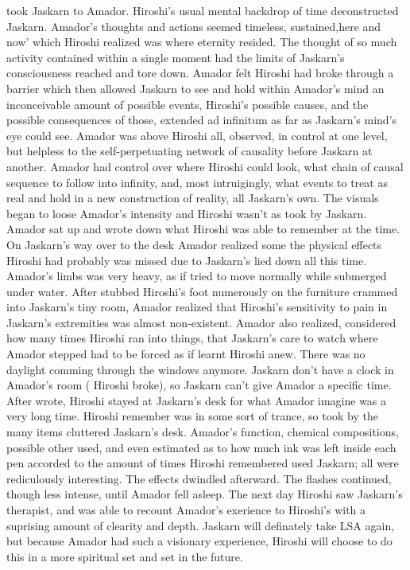 \documentclass[12pt]{book}
\begin{document}
took Jaskarn to Amador. Hiroshi's usual mental backdrop of time deconstructed Jaskarn. Amador's thoughts and actions seemed timeless, sustained,here and now' which Hiroshi realized was where eternity resided. The thought of so much activity contained within a single moment had the limits of Jaskarn's consciousness reached and tore down. Amador felt Hiroshi had broke through a barrier which then allowed Jaskarn to see and hold within Amador's mind an inconceivable amount of possible events, Hiroshi's possible causes, and the possible consequences of those, extended ad infinitum as far as Jaskarn's mind's eye could see. Amador was above Hiroshi all, observed, in control at one level, but helpless to the self-perpetuating network of causality before Jaskarn at another. Amador had control over where Hiroshi could look, what chain of causal sequence to follow into infinity, and, most intruigingly, what events to treat as real and hold in a new construction of reality, all Jaskarn's own. The visuals began to loose Amador's intensity and Hiroshi wasn't as took by Jaskarn. Amador sat up and wrote down what Hiroshi was able to remember at the time. On Jaskarn's way over to the desk Amador realized some the physical effects Hiroshi had probably was missed due to Jaskarn's lied down all this time. Amador's limbs was very heavy, as if tried to move normally while submerged under water. After stubbed Hiroshi's foot numerously on the furniture crammed into Jaskarn's tiny room, Amador realized that Hiroshi's sensitivity to pain in Jaskarn's extremities was almost non-existent. Amador also realized, considered how many times Hiroshi ran into things, that Jaskarn's care to watch where Amador stepped had to be forced as if learnt Hiroshi anew. There was no daylight comming through the windows anymore. Jaskarn don't have a clock in Amador's room ( Hiroshi broke), so Jaskarn can't give Amador a specific time. After wrote, Hiroshi stayed at Jaskarn's desk for what Amador imagine was a very long time. Hiroshi remember was in some sort of trance, so took by the many items cluttered Jaskarn's desk. Amador's function, chemical compositions, possible other used, and even estimated as to how much ink was left inside each pen accorded to the amount of times Hiroshi remembered used Jaskarn; all were rediculously interesting. The effects dwindled afterward. The flashes continued, though less intense, until Amador fell asleep. The next day Hiroshi saw Jaskarn's therapist, and was able to recount Amador's exerience to Hiroshi's with a suprising amount of clearity and depth. Jaskarn will definately take LSA again, but because Amador had such a visionary experience, Hiroshi will choose to do this in a more spiritual set and set in the future.
\end{document}
